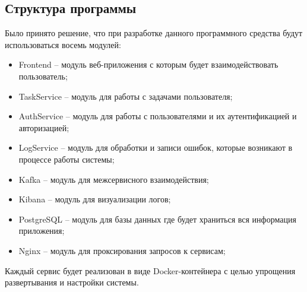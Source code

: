 \subsection{Структура программы}

Было принято решение, что при разработке данного программного средства будут использоваться восемь модулей:
\begin{itemize}
    \item Frontend -- модуль веб-приложения с которым будет взаимодействовать пользователь;
    \item TaskService -- модуль для работы с задачами пользователя;
    \item AuthService -- модуль для работы с пользователями и их аутентификацией и авторизацией;
    \item LogService -- модуль для обработки и записи ошибок, которые возникают в процессе работы системы;
    \item Kafka -- модуль для межсервисного взаимодействия;
    \item Kibana -- модуль для визуализации логов;
    \item PostgreSQL -- модуль для базы данных где будет храниться вся информация приложения;
    \item Nginx -- модуль для проксирования запросов к сервисам;
\end{itemize}

Каждый сервис будет реализован в виде Docker-контейнера с целью упрощения развертывания и настройки системы.